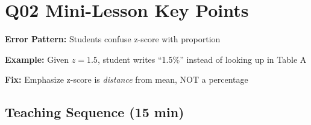 \documentclass[11pt]{article}
\begin{document}
\newpage

\section*{Q02 Mini-Lesson Key Points}

\begin{tcolorbox}[colback=red!10!white,colframe=red!75!black,title=\textbf{Common Misconception (33\% of students)}]

\textbf{Error Pattern:} Students confuse z-score with proportion

\textbf{Example:} Given $z = 1.5$, student writes ``1.5\%'' instead of looking up in Table A

\textbf{Fix:} Emphasize z-score is \textit{distance} from mean, NOT a percentage
\end{tcolorbox}

\subsection*{Teaching Sequence (15 min)}
\end{document}
